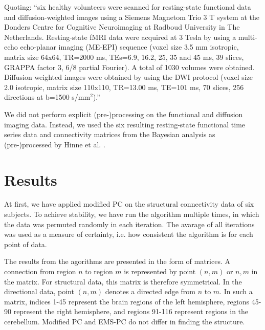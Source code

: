 \documentclass[a4paper, 10pt, english, onecolumn]{article}
\begin{document}
Quoting: ``six healthy volunteers were scanned for resting-state functional data and diffusion-weighted images using a Siemens Magnetom Trio 3 T system at the Donders Centre for Cognitive Neuroimaging at Radboud University in The Netherlands.
Resting-state fMRI data were acquired at 3 Tesla by using a multi-echo echo-planar imaging (ME-EPI) sequence (voxel size 3.5 mm isotropic, matrix size 64x64, TR=2000 ms, TEs=6.9, 16.2, 25, 35 and 45 ms, 39 slices, GRAPPA factor 3, 6/8 partial Fourier).
A total of 1030 volumes were obtained.
Diffusion weighted images were obtained by using the DWI protocol (voxel size 2.0 isotropic, matrix size 110x110, TR=13.00 ms, TE=101 ms, 70 slices, 256 directions at b=1500 s/mm$^2$).''

We did not perform explicit (pre-)processing on the functional and diffusion imaging data.
Instead, we used the six resulting resting-state functional time series data and connectivity matrices from the Bayesian analysis as (pre-)processed by Hinne et al. \cite{hinne2013}.

\section{Results}
At first, we have applied modified PC on the structural connectivity data of six subjects.
To achieve stability, we have run the algorithm multiple times, in which the data was permuted randomly in each iteration.
The avarage of all iterations was used as a measure of certainty, i.e. how consistent the algorithm is for each point of data.

The results from the agorithms are presented in the form of matrices.
A connection from region $n$ to region $m$ is represented by point $(n,m)$ or $n,m$ in the matrix.
For structural data, this matrix is therefore symmetrical.
In the directional data, point $(n,m)$ denotes a directed edge from $n$ to $m$.
In such a matrix, indices 1-45 represent the brain regions of the left hemisphere, regions 45-90 represent the right hemisphere, and regions 91-116 represent regions in the cerebellum.
Modified PC and EMS-PC do not differ in finding the structure.
\end{document}
